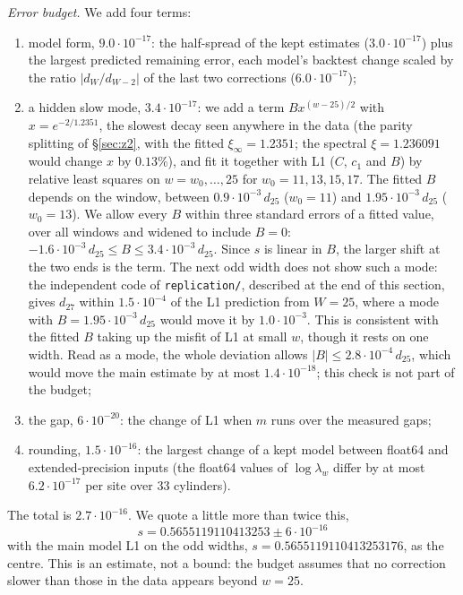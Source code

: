 \documentclass[11pt]{amsart}
\theoremstyle{definition}
\theoremstyle{remark}
\newcommand{\file}[1]{\texttt{#1}}
\begin{document}
\emph{Error budget.} We add four terms:
\begin{enumerate}
\item model form, $9.0\cdot10^{-17}$: the half-spread of the kept estimates ($3.0\cdot10^{-17}$) plus
the largest predicted remaining error, each model's backtest change scaled by the ratio
$|d_W/d_{W-2}|$ of the last two corrections ($6.0\cdot10^{-17}$);
\item a hidden slow mode, $3.4\cdot10^{-17}$: we add a term $B x^{(w-25)/2}$ with
$x = e^{-2/1.2351}$, the slowest decay seen anywhere in the data (the parity splitting of
\S\ref{sec:z2}, with the fitted $\xi_\infty = 1.2351$; the spectral $\xi = 1.236091$ would change
$x$ by $0.13\%$), and fit it together with L1 ($C$, $c_1$ and $B$) by relative least squares on
$w = w_0, \dots, 25$ for $w_0 = 11, 13, 15, 17$. The fitted $B$ depends on the window, between
$0.9\cdot10^{-3}\,d_{25}$ ($w_0 = 11$) and $1.95\cdot10^{-3}\,d_{25}$ ($w_0 = 13$). We allow every $B$ within three
standard errors of a fitted value, over all windows and widened to include $B = 0$:
$-1.6\cdot10^{-3}\,d_{25} \le B \le 3.4\cdot10^{-3}\,d_{25}$. Since $s$ is linear in $B$, the larger shift at
the two ends is the term. The next odd width does not show such a mode: the independent code of
\file{replication/}, described at the end of this section, gives $d_{27}$ within $1.5\cdot10^{-4}$ of the L1 prediction from $W = 25$, where a mode
with $B = 1.95\cdot10^{-3}\,d_{25}$ would move it by $1.0\cdot10^{-3}$. This is consistent with the fitted $B$
taking up the misfit of L1 at small $w$, though it rests on one width. Read as a mode, the whole
deviation allows $|B| \le 2.8\cdot10^{-4}\,d_{25}$, which would move the main estimate by at most
$1.4\cdot10^{-18}$; this check is not part of the budget;
\item the gap, $6\cdot10^{-20}$: the change of L1 when $m$ runs over the measured gaps;
\item rounding, $1.5\cdot10^{-16}$: the largest change of a kept model between float64 and
extended-precision inputs (the float64 values of $\log\lambda_w$ differ by at most $6.2\cdot10^{-17}$
per site over $33$ cylinders).
\end{enumerate}
The total is $2.7\cdot10^{-16}$. We quote a little more than twice this,
\[
  \boxed{\,s = 0.5655119110413253 \pm 6\cdot10^{-16}\,}
\]
with the main model L1 on the odd widths, $s = 0.5655119110413253176$, as the centre. This is an
estimate, not a bound: the budget assumes that no correction slower than those in the data
appears beyond $w = 25$.
\end{document}
